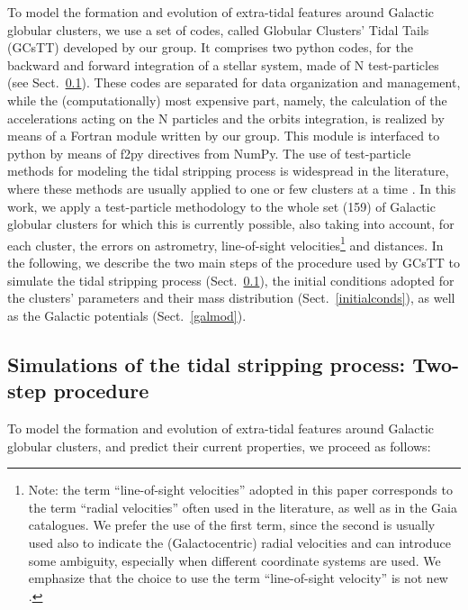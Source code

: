     To model the formation and evolution of extra-tidal features around Galactic globular clusters, we use a set of codes, called Globular Clusters' Tidal Tails (GCsTT)  developed by our group. It comprises two python codes, for the backward and forward integration of a stellar system, made of N test-particles (see Sect.~\ref{numerical}). These codes are separated for data organization and management, while the (computationally) most expensive part, namely, the calculation of the accelerations acting on the N particles and the orbits integration, is realized by means of a Fortran module written by our group. This module is interfaced to python by means of f2py directives from NumPy. The use of test-particle methods for modeling the tidal stripping process is widespread in the literature, where these methods are  usually applied to one or few clusters at a time \citep[see, e.g., ][]{2012MNRAS.423.2845L, 2012A&A...546L...7M, 2019MNRAS.488.1535P, 2021MNRAS.505.3033P, 2022ApJ...929...89G}. In this work, we apply a test-particle methodology to the whole set (159) of Galactic globular clusters for which this is currently possible, also taking into account, for each cluster, the errors on astrometry, line-of-sight velocities\footnote{Note: the term ``line-of-sight velocities''  adopted in this paper corresponds to the term ``radial velocities'' often used in the literature, as well as in the Gaia catalogues. We prefer the use of the first term, since the second is usually used also to indicate the (Galactocentric) radial velocities and can introduce some ambiguity, especially when different coordinate systems are used. We emphasize that the choice to use the term ``line-of-sight velocity'' is not new \citep[see, e.g., ][]{2021MNRAS.505.5978V}.} and distances. In the following, we describe the two main steps of the procedure used by GCsTT  to simulate the tidal stripping process (Sect.~\ref{numerical}), the initial conditions adopted for the clusters' parameters and their mass distribution (Sect.~\ref{initialconds}), as well as the Galactic potentials (Sect.~\ref{galmod}).
    \subsection{Simulations of the tidal stripping process:  Two-step procedure}\label{numerical}
        To model the formation and evolution of extra-tidal features around Galactic globular clusters, and predict their current properties, we proceed as follows: 

